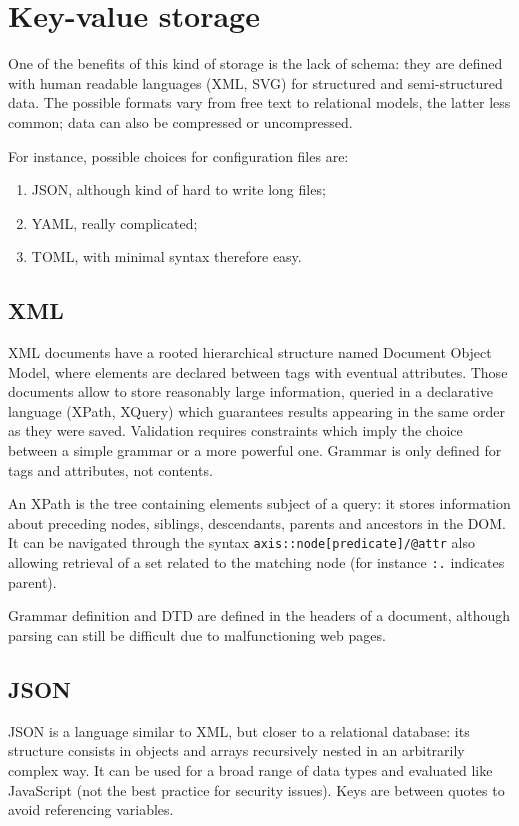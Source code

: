 \section{Key-value storage}
One of the benefits of this kind of storage is the lack of schema: they are defined with human readable languages (XML, SVG) for structured and semi-structured data. The possible formats vary from free text to relational models, the latter less common; data can also be compressed or uncompressed. 

For instance, possible choices for configuration files are:
\begin{enumerate}
	\item JSON, although kind of hard to write long files;
	\item YAML, really complicated;
	\item TOML, with minimal syntax therefore easy.
\end{enumerate}

\subsection{XML}
XML documents have a rooted hierarchical structure named Document Object Model, where elements are declared between tags with eventual attributes. Those documents allow to store reasonably large information, queried in a declarative language (XPath, XQuery) which guarantees results appearing in the same order as they were saved. Validation requires constraints which imply the choice between a simple grammar or a more powerful one. Grammar is only defined for tags and attributes, not contents. 

An XPath is the tree containing elements subject of a query: it stores information about preceding nodes, siblings, descendants, parents and ancestors in the DOM. It can be navigated through the syntax \texttt{axis::node[predicate]/@attr} also allowing retrieval of a set related to the matching node (for instance \texttt{:.} indicates parent). 

Grammar definition and DTD are defined in the headers of a document, although parsing can still be difficult due to malfunctioning web pages. 

\subsection{JSON}
JSON is a language similar to XML, but closer to a relational database: its structure consists in objects and arrays recursively nested in an arbitrarily complex way. It can be used for a broad range of data types and evaluated like JavaScript (not the best practice for security issues). Keys are between quotes to avoid referencing variables. 

